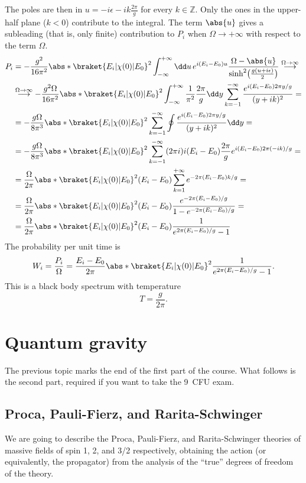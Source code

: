 \documentclass[a4paper,12pt]{book}
\begin{document}
The poles are then in $u=-i\epsilon-ik\frac{2\pi}g$ for every $k\in\mathbb Z$. Only the ones in the upper-half plane ($k<0$) contribute to the integral. The term $\abs{u}$ gives a subleading (that is, only finite) contribution to $P_i$ when $\Omega\to+\infty$ with respect to the term $\Omega$.
\begin{align*}
P_i&=-\frac{g^2}{16\pi^2}\abs*{\braket{E_i|\chi(0)|E_0}}^2\int_{-\infty}^{+\infty}\dd u\,e^{i(E_i-E_0)u}\frac{\Omega-\abs{u}}{\sinh^2\bigl(\frac{g(u+i\epsilon)}2\bigr)}\overset{\Omega\to\infty}{\longrightarrow}\\
&\overset{\Omega\to\infty}{\longrightarrow}-\frac{g^2\Omega}{16\pi^2}\abs*{\braket{E_i|\chi(0)|E_0}}^2\int_{-\infty}^{+\infty}\frac1{\pi^2}\frac{2\pi}{g}\dd y\sum_{k=-1}^{-\infty}\frac{e^{i(E_i-E_0)2\pi y/g}}{(y+ik)^2}=\\
&=-\frac{g\Omega}{8\pi^3}\abs*{\braket{E_i|\chi(0)|E_0}}^2\sum_{k=-1}^{-\infty}\oint\frac{e^{i(E_i-E_0)2\pi y/g}}{(y+ik)^2}\dd y=\\
&=-\frac{g\Omega}{8\pi^3}\abs*{\braket{E_i|\chi(0)|E_0}}^2\sum_{k=-1}^{-\infty}(2\pi i)i(E_i-E_0)\frac{2\pi}{g}e^{i(E_i-E_0)2\pi (-ik)/g}=\\
&=\frac{\Omega}{2\pi}\abs*{\braket{E_i|\chi(0)|E_0}}^2(E_i-E_0)\sum_{k=1}^{+\infty}e^{-2\pi(E_i-E_0)k/g}=\\
&=\frac{\Omega}{2\pi}\abs*{\braket{E_i|\chi(0)|E_0}}^2(E_i-E_0)\frac{e^{-2\pi(E_i-E_0)/g}}{1-e^{-2\pi(E_i-E_0)/g}}=\\
&=\frac{\Omega}{2\pi}\abs*{\braket{E_i|\chi(0)|E_0}}^2(E_i-E_0)\frac1{e^{2\pi(E_i-E_0)/g}-1}
\end{align*}
The probability per unit time is
\[W_i=\frac{P_i}{\Omega}=\frac{E_i-E_0}{2\pi}\abs*{\braket{E_i|\chi(0)|E_0}}^2\frac1{e^{2\pi(E_i-E_0)/g}-1}.\]
This is a black body spectrum with temperature
\[T=\frac{g}{2\pi}.\]

\chapter{Quantum gravity}
The previous topic marks the end of the first part of the course.
What follows is the second part, required if you want to take the \SI{9}{CFU} exam.

\section{Proca, Pauli-Fierz, and Rarita-Schwinger}
We are going to describe the Proca, Pauli-Fierz, and Rarita-Schwinger theories of 
massive fields of spin 1, 2, and 3/2 respectively, obtaining the action 
(or equivalently, the propagator) from the analysis of the ``true'' degrees of 
freedom of the theory.
\end{document}
